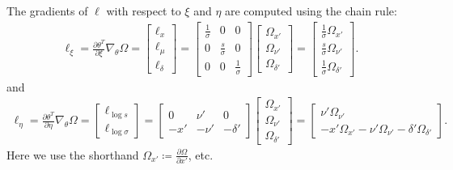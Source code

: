 \documentclass{article}
\begin{document}
The gradients of $\ell$ with respect to $\xi$ and $\eta$ are computed using the chain rule:
%
\begin{align}
  \ell_\xi = \frac{\partial \theta^T}{\partial \xi} \nabla_\theta \Omega =
  \begin{bmatrix} \ell_x \\ \ell_\mu \\ \ell_\delta \end{bmatrix}
  =
  \begin{bmatrix}
    \frac{1}{\sigma} & 0                & 0                \\
    0                & \frac{s}{\sigma} & 0                \\
    0                & 0                & \frac{1}{\sigma}
  \end{bmatrix}
  \begin{bmatrix} \Omega_{x'} \\ \Omega_{\nu'} \\ \Omega_{\delta'} \end{bmatrix}
  =
  \begin{bmatrix}
    \frac{1}{\sigma} \Omega_{x'}   \\
    \frac{s}{\sigma} \Omega_{\nu'} \\
    \frac{1}{\sigma} \Omega_{\delta'}
  \end{bmatrix}.
\end{align}
%
and
%
\begin{align}
  \ell_\eta = \frac{\partial \theta^T}{\partial \eta} \nabla_\theta \Omega =
  \begin{bmatrix} \ell_{\log s} \\ \ell_{\log \sigma} \end{bmatrix}
  =
  \begin{bmatrix}
    0   & \nu'  & 0        \\
    -x' & -\nu' & -\delta'
  \end{bmatrix}
  \begin{bmatrix} \Omega_{x'} \\ \Omega_{\nu'} \\ \Omega_{\delta'} \end{bmatrix}
  =
  \begin{bmatrix}
    \nu' \Omega_{\nu'} \\
    -x' \Omega_{x'} - \nu' \Omega_{\nu'} - \delta' \Omega_{\delta'}
  \end{bmatrix}.
\end{align}
%
Here we use the shorthand $\Omega_{x'} \coloneqq \frac{\partial \Omega}{\partial x'}$, etc.
\end{document}

